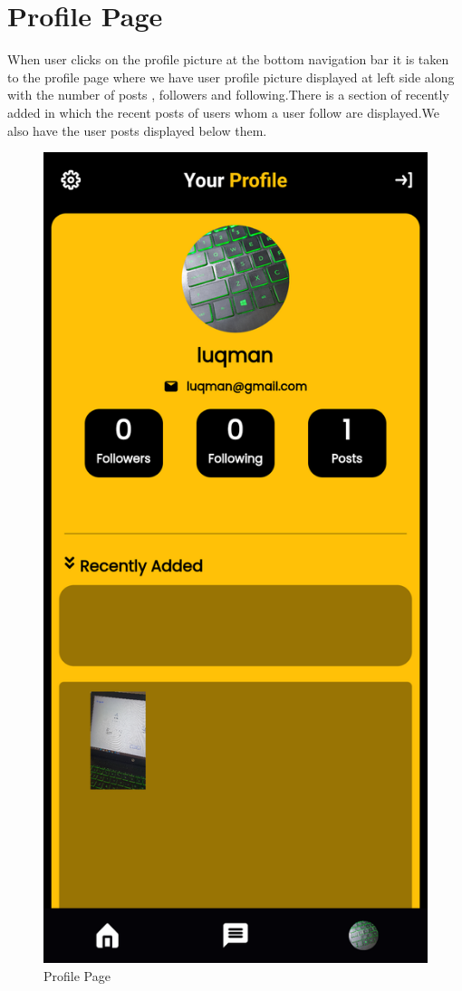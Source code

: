 \section{Profile Page}
When user clicks on the profile picture at the bottom navigation bar it is taken to the profile page where we have user profile picture displayed at left side along with the number of posts , followers and following.There is a section of recently added in which the recent posts of users whom a user follow are displayed.We also have the user posts displayed below them.
\begin{figure}[H]
    \centering
    \includegraphics[scale=0.13]{App Screenshots/profile Page.png}
    \caption{Profile Page}
    \label{fig:Profile Page}
\end{figure}
